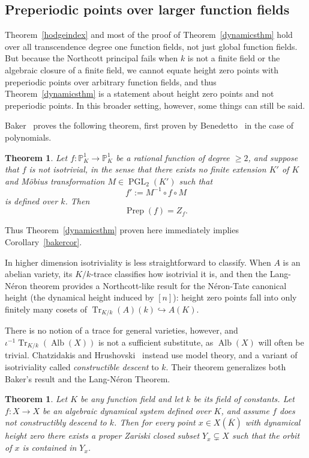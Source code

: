 \documentclass[times, doublespace]{amsart}
\numberwithin{equation}{section}
\theoremstyle{plain}
\newtheorem{theorem}[equation]{Theorem}
\theoremstyle{definition}
\DeclareMathOperator{\Prep}{Prep}
\DeclareMathOperator{\Alb}{Alb}
\DeclareMathOperator{\PGL}{PGL}
\newcommand{\Tr}{\operatorname{Tr}}
\renewcommand{\P}{\mathbb{P}}
\begin{document}
\subsection{Preperiodic points over larger function fields}
Theorem~\ref{hodgeindex} and most of the proof of Theorem~\ref{dynamicsthm} hold over all transcendence degree one function fields, not just global function fields. But because the Northcott principal fails when $k$ is not a finite field or the algebraic closure of a finite field, we cannot equate height zero points with preperiodic points over arbitrary function fields, and thus Theorem~\ref{dynamicsthm} is a statement about height zero points and not preperiodic points. In this broader setting, however, some things can still be said.


Baker~\cite{bakerisotrivial} proves the following theorem, first proven by Benedetto~\cite{benedetto} in the case of polynomials.

\begin{theorem}
Let $f:\P^1_K\to\P^1_K$ be a rational function of degree $\ge2$, and suppose that $f$ is not isotrivial, in the sense that there exists no finite extension $K'$ of $K$ and M\"obius transformation $M\in \PGL_2(K')$ such that 
\[ f':=M^{-1}\circ f\circ M\]
is defined over $k$. Then
\[ \Prep(f)=Z_f.\]
\end{theorem}

Thus Theorem~\ref{dynamicsthm} proven here immediately implies Corollary~\ref{bakercor}.

In higher dimension isotriviality is less straightforward to classify. When $A$ is an abelian variety, its $K/k$-trace classifies how isotrivial it is, and then the Lang-N\'eron theorem provides a Northcott-like result for the N\'eron-Tate canonical height (the dynamical height induced by $[n]$): height zero points fall into only finitely many cosets of $\Tr_{K/k}(A)(k)\hookrightarrow A(K)$. 

There is no notion of a trace for general varieties, however, and $\iota^{-1}\Tr_{K/k}(\Alb(X))$ is not a sufficient substitute, as $\Alb(X)$ will often be trivial. Chatzidakis and Hrushovski~\cite{chatzidakis1,chatzidakis2} instead use model theory, and a variant of isotriviality called \emph{constructible descent} to $k$. Their theorem generalizes both Baker's result and the Lang-N\'eron Theorem.



\begin{theorem}
Let $K$ be any function field and let $k$ be its field of constants. Let $f:X\to X$ be an algebraic dynamical system defined over $K$, and assume $f$ does not constructibly descend to $k$. Then for every point $x\in X(\overline K)$ with dynamical height zero there exists a proper Zariski closed subset $Y_x\subsetneq X$ such that the orbit of $x$ is contained in $Y_x$.
\end{theorem}
\end{document}
